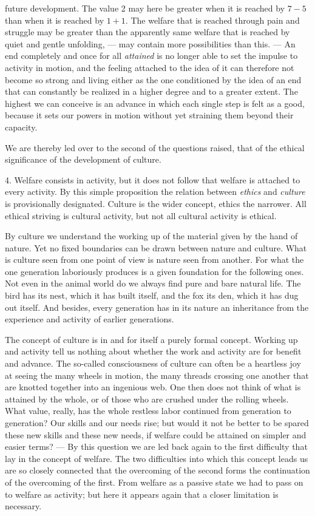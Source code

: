 \documentclass[12pt,a4paper,openany]{book}
\newcommand{\opage}[1]{\marginnote{\footnotesize\textit{[#1]}}}
\begin{document}
future development. The value 2 may here be greater when it is reached by $7 - 5$ than when it is reached by
$1 + 1$. The welfare that is reached through pain and struggle may be greater than the apparently same
welfare that is reached by quiet and gentle unfolding, --- may contain more possibilities than this. --- An
end completely and once for all \textit{attained} is no longer able to set the impulse to activity in
motion, and the feeling attached to the idea of it can therefore not become so strong and living either
as the one conditioned by the idea of an end that can constantly be realized in a higher degree and to a
greater extent. The highest we can conceive is an advance in which each single step is felt as a good,
because it sets our powers in motion without yet straining them beyond their capacity.

We are thereby led over to the second of the questions raised, that of the ethical significance of the
development of culture.

4. Welfare consists in activity, but it does not follow that welfare is attached to every activity. By this
simple proposition the relation between \textit{ethics} and \textit{culture} is provisionally designated.
Culture is the wider concept, ethics the narrower. All ethical striving is cultural activity, but not all
cultural activity is ethical.

\opage{146}By culture we understand the working up of the material given by the hand of nature. Yet no fixed
boundaries can be drawn between nature and culture. What is culture seen from one point of view is nature
seen from another. For what the one generation laboriously produces is a given foundation for the
following ones. Not even in the animal world do we always find pure and bare natural life. The bird has
its nest, which it has built itself, and the fox its den, which it has dug out itself. And besides, every
generation has in its nature an inheritance from the experience and activity of earlier generations.

The concept of culture is in and for itself a purely formal concept. Working up and activity tell us
nothing about whether the work and activity are for benefit and advance. The so-called consciousness of
culture can often be a heartless joy at seeing the many wheels in motion, the many threads crossing one
another that are knotted together into an ingenious web. One then does not think of what is attained by
the whole, or of those who are crushed under the rolling wheels. What value, really, has the whole
restless labor continued from generation to generation? Our skills and our needs rise; but would it not be
better to be spared these new skills and these new needs, if welfare could be attained on simpler and
easier terms? --- By this question we are led back again to the first difficulty that lay in the concept of
welfare. The two difficulties into which this concept leads us are so closely connected that the
overcoming of the second forms the continuation of the overcoming of the first. From welfare as a passive
state we had to pass on to welfare as activity; but here it appears again that a closer limitation is
necessary.
\end{document}
